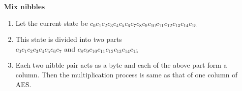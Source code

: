 \begin{frame}
	\textbf{Mix nibbles}
\begin{enumerate}

	\item Let the current state be $c_{0} c_{1} c_{2} c_{3} c_{4} c_{5} c_{6} c_{7} c_{8} c_{9} c_{10} c_{11} c_{12} c_{13} c_{14} c_{15}$\\
	
	\item This state is divided into two parts \\
	$ c_{0} c_{1} c_{2} c_{3} c_{4} c_{5} c_{6} c_{7} $ and $c_{8} c_{9} c_{10} c_{11} c_{12} c_{13} c_{14} c_{15}$ \\
	
	\item Each two nibble pair acts as a byte and each of the above part form a column. Then the multiplication process is same as that of one column of AES.
\end{enumerate}

\end{frame}	


